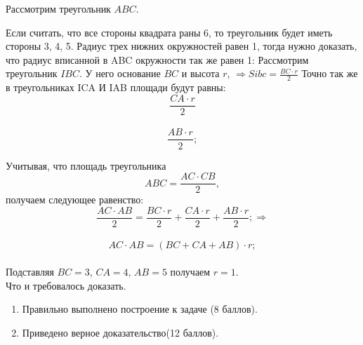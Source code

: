\solutionSection

Рассмотрим треугольник $ABC$. 

Если считать, что все стороны квадрата раны 6, то треугольник будет иметь стороны 3, 4, 5. Радиус трех нижних окружностей равен 1, тогда нужно доказать, что радиус вписанной в ABC окружности так же равен 1: 
Рассмотрим треугольник $IBC$. У него основание $BC$ и высота $r$, $\Rightarrow Sibc =  \frac{BC \cdot r}{2}$
Точно так же в треугольниках ICA И IAB площади будут равны:
\begin{displaymath} 
\frac{CA \cdot r}{2} 
\end{displaymath}\\
\begin{displaymath} 
\frac{AB \cdot r}{2};
\end{displaymath}

Учитывая, что площадь треугольника \begin{displaymath}  ABC = \frac{AC \cdot CB}{2}, \end{displaymath} получаем следующее равенство: 
\begin{displaymath}
\frac{AC \cdot AB}{2} = \frac{BC \cdot r}{2} + \frac{CA \cdot r}{2} +  \frac{AB \cdot r}{2}; \Rightarrow 
\end{displaymath}\\
\begin{displaymath}
AC \cdot AB = (BC + CA + AB) \cdot r;
\end{displaymath}\\

Подставляя $BC=3$, $CA=4$, $AB=5$ получаем $r=1$.\\

Что и требовалось доказать.

\markSection

\begin{enumerate}
    \item Правильно выполнено построение к задаче (8 баллов). 
    \item Приведено верное доказательство(12 баллов).
\end{enumerate}